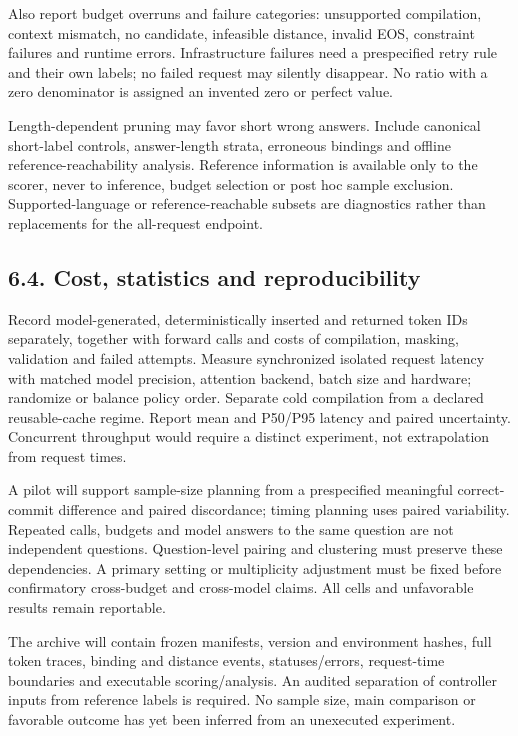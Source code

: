 \documentclass[
  12pt,
  a4paper,
]{article}
\begin{document}
Also report budget overruns and failure categories: unsupported
compilation, context mismatch, no candidate, infeasible distance,
invalid EOS, constraint failures and runtime errors. Infrastructure
failures need a prespecified retry rule and their own labels; no failed
request may silently disappear. No ratio with a zero denominator is
assigned an invented zero or perfect value.

Length-dependent pruning may favor short wrong answers. Include
canonical short-label controls, answer-length strata, erroneous bindings
and offline reference-reachability analysis. Reference information is
available only to the scorer, never to inference, budget selection or
post hoc sample exclusion. Supported-language or reference-reachable
subsets are diagnostics rather than replacements for the all-request
endpoint.

\subsection{6.4. Cost, statistics and
reproducibility}\label{cost-statistics-and-reproducibility}

Record model-generated, deterministically inserted and returned token
IDs separately, together with forward calls and costs of compilation,
masking, validation and failed attempts. Measure synchronized isolated
request latency with matched model precision, attention backend, batch
size and hardware; randomize or balance policy order. Separate cold
compilation from a declared reusable-cache regime. Report mean and
P50/P95 latency and paired uncertainty. Concurrent throughput would
require a distinct experiment, not extrapolation from request times.

A pilot will support sample-size planning from a prespecified meaningful
correct-commit difference and paired discordance; timing planning uses
paired variability. Repeated calls, budgets and model answers to the
same question are not independent questions. Question-level pairing and
clustering must preserve these dependencies. A primary setting or
multiplicity adjustment must be fixed before confirmatory cross-budget
and cross-model claims. All cells and unfavorable results remain
reportable.

The archive will contain frozen manifests, version and environment
hashes, full token traces, binding and distance events, statuses/errors,
request-time boundaries and executable scoring/analysis. An audited
separation of controller inputs from reference labels is required. No
sample size, main comparison or favorable outcome has yet been inferred
from an unexecuted experiment.
\end{document}
